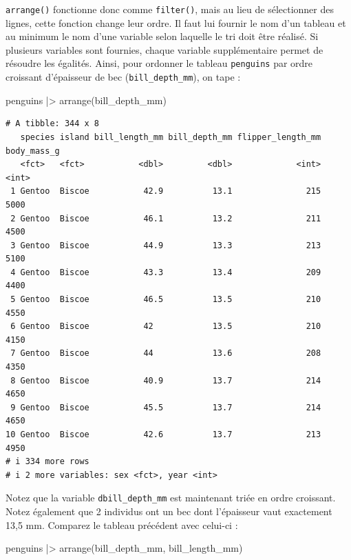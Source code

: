 \documentclass[
  a4paper,
  DIV=11,
  numbers=noendperiod,
  oneside]{scrreprt}
\newenvironment{Shaded}{}{}
\newcommand{\FunctionTok}[1]{\textcolor[rgb]{0.44,0.26,0.76}{#1}}
\newcommand{\NormalTok}[1]{\textcolor[rgb]{0.14,0.16,0.18}{#1}}
\newcommand{\SpecialCharTok}[1]{\textcolor[rgb]{0.00,0.36,0.77}{#1}}
\begin{document}
\texttt{arrange()} fonctionne donc comme \texttt{filter()}, mais au lieu
de sélectionner des lignes, cette fonction change leur ordre. Il faut
lui fournir le nom d'un tableau et au minimum le nom d'une variable
selon laquelle le tri doit être réalisé. Si plusieurs variables sont
fournies, chaque variable supplémentaire permet de résoudre les
égalités. Ainsi, pour ordonner le tableau \texttt{penguins} par ordre
croissant d'épaisseur de bec (\texttt{bill\_depth\_mm}), on tape :

\begin{Shaded}
\begin{Highlighting}[]
\NormalTok{penguins }\SpecialCharTok{|\textgreater{}}
  \FunctionTok{arrange}\NormalTok{(bill\_depth\_mm)}
\end{Highlighting}
\end{Shaded}

\begin{verbatim}
# A tibble: 344 x 8
   species island bill_length_mm bill_depth_mm flipper_length_mm body_mass_g
   <fct>   <fct>           <dbl>         <dbl>             <int>       <int>
 1 Gentoo  Biscoe           42.9          13.1               215        5000
 2 Gentoo  Biscoe           46.1          13.2               211        4500
 3 Gentoo  Biscoe           44.9          13.3               213        5100
 4 Gentoo  Biscoe           43.3          13.4               209        4400
 5 Gentoo  Biscoe           46.5          13.5               210        4550
 6 Gentoo  Biscoe           42            13.5               210        4150
 7 Gentoo  Biscoe           44            13.6               208        4350
 8 Gentoo  Biscoe           40.9          13.7               214        4650
 9 Gentoo  Biscoe           45.5          13.7               214        4650
10 Gentoo  Biscoe           42.6          13.7               213        4950
# i 334 more rows
# i 2 more variables: sex <fct>, year <int>
\end{verbatim}

Notez que la variable \texttt{dbill\_depth\_mm} est maintenant triée en
ordre croissant. Notez également que 2 individus ont un bec dont
l'épaisseur vaut exactement 13,5 mm. Comparez le tableau précédent avec
celui-ci :

\begin{Shaded}
\begin{Highlighting}[]
\NormalTok{penguins }\SpecialCharTok{|\textgreater{}}
  \FunctionTok{arrange}\NormalTok{(bill\_depth\_mm, bill\_length\_mm)}
\end{Highlighting}
\end{Shaded}
\end{document}
